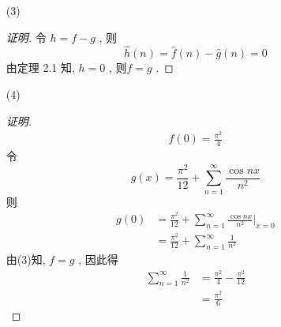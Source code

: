\documentclass{article}
\begin{document}
\begin{enumerate}
\begin{enumerate}
\begin{proof}[解]
        \end{proof}
        \item[(3)] \begin{proof}[证明]
            令 $h=f-g$ , 则\begin{equation}
                \hat{h}(n)=\hat{f}(n)-\hat{g}(n)=0
            \end{equation}
            由定理 2.1 知, $h=0$ , 则$f=g$ .
        \end{proof}
        \item[(4)] \begin{proof}[证明]
            \begin{equation}
                \begin{aligned}
                    f(0)=\frac{\pi^2}{4}
                \end{aligned}
            \end{equation}
            令\begin{equation}
                g(x)=\frac{\pi^2}{12}+\sum_{n=1}^{\infty}\frac{\cos nx}{n^2}
            \end{equation}
            则
            \begin{equation}
                \begin{aligned}
                    g(0)
                    &=\frac{\pi^2}{12}+\sum_{n=1}^{\infty}\frac{\cos nx}{n^2}\bigg|_{x=0} \\
                    &=\frac{\pi^2}{12}+\sum_{n=1}^{\infty}\frac{1}{n^2}
                \end{aligned}
            \end{equation}
            由(3)知, $f=g$ , 因此得\begin{equation}
                \begin{aligned}
                    \sum_{n=1}^{\infty}\frac{1}{n^2}
                    &=\frac{\pi^2}{4}-\frac{\pi^2}{12} \\
                    &=\frac{\pi^2}{6}
                \end{aligned}
            \end{equation}
        \end{proof}
    \end{enumerate}
\end{enumerate}
\end{document}
